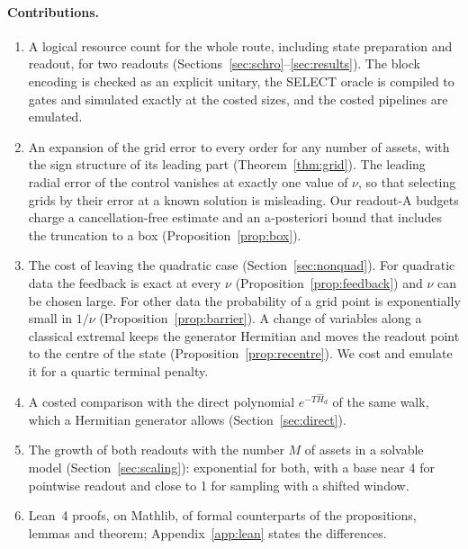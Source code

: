 \documentclass[11pt,a4paper]{article}
\theoremstyle{remark}
\newcommand{\Hd}{\hat H_d}
\begin{document}
\paragraph{Contributions.}
\begin{enumerate}
\item A logical resource count for the whole route, including state
preparation and readout, for two readouts (Sections~\ref{sec:schro}--\ref{sec:results}).
The block encoding is checked as an explicit unitary, the SELECT oracle is
compiled to gates and simulated exactly at the costed sizes, and the costed
pipelines are emulated.
\item An expansion of the grid error to every order for any number of assets,
with the sign structure of its leading part (Theorem~\ref{thm:grid}). The
leading radial error of the control vanishes at exactly one value of $\nu$, so
that selecting grids by their error at a known solution is misleading. Our
readout-A budgets charge a cancellation-free estimate and an a-posteriori
bound that includes the truncation to a box (Proposition~\ref{prop:box}).
\item The cost of leaving the quadratic case (Section~\ref{sec:nonquad}). For
quadratic data the feedback is exact at every $\nu$
(Proposition~\ref{prop:feedback}) and $\nu$ can be chosen large. For other data
the probability of a grid point is exponentially small in $1/\nu$
(Proposition~\ref{prop:barrier}). A change of variables along a classical
extremal keeps the generator Hermitian and moves the readout point to the
centre of the state (Proposition~\ref{prop:recentre}). We cost and emulate it
for a quartic terminal penalty.
\item A costed comparison with the direct polynomial $e^{-T\Hd}$ of the same walk, which a Hermitian generator
allows (Section~\ref{sec:direct}).
\item The growth of both readouts with the number $M$ of assets in a solvable
model (Section~\ref{sec:scaling}): exponential for both, with a base near 4 for
pointwise readout and close to 1 for sampling with a shifted window.
\item Lean~4 proofs, on Mathlib, of formal counterparts of the propositions,
lemmas and theorem; Appendix~\ref{app:lean} states the differences.
\end{enumerate}
\end{document}
